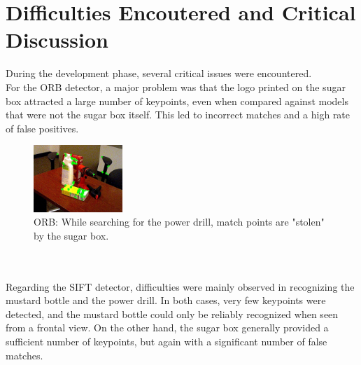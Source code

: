 \documentclass[10.5pt,a4paper]{article}
\begin{document}
\section*{Difficulties Encoutered and Critical Discussion}
During the development phase, several critical issues were encountered.\\
For the ORB detector, a major problem was that the logo printed on the sugar box attracted a large number of keypoints, even when compared against models that were not the sugar box itself. This led to incorrect matches and a high rate of false positives.
\begin{figure}[h]
    \centering
    \includegraphics[width=0.3\textwidth]{img/power_drill matches_screenshot_28.04.2025.png}
    \caption{ORB: While searching for the power drill, match points are "stolen" by the sugar box.}
    \label{fig:prima}
\end{figure}
\\\\
Regarding the SIFT detector, difficulties were mainly observed in recognizing the mustard bottle and the power drill. In both cases, very few keypoints were detected, and the mustard bottle could only be reliably recognized when seen from a frontal view. On the other hand, the sugar box generally provided a sufficient number of keypoints, but again with a significant number of false matches.
\end{document}
